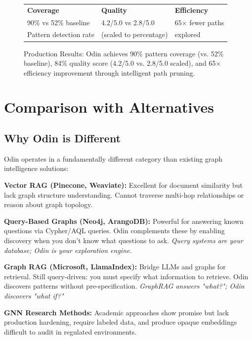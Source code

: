 \documentclass[11pt]{article}
\begin{document}
\begin{figure}[ht]
\begin{center}
\begin{tabular}{p{4cm}p{4cm}p{4cm}}
\small\textbf{Coverage} & \small\textbf{Quality} & \small\textbf{Efficiency} \\
\scriptsize 90\% vs 52\% baseline & \scriptsize 4.2/5.0 vs 2.8/5.0 & \scriptsize 65× fewer paths \\
\scriptsize Pattern detection rate & \scriptsize (scaled to percentage) & \scriptsize explored \\
\end{tabular}
\end{center}
\caption{Production Results: Odin achieves 90\% pattern coverage (vs. 52\% baseline), 84\% quality score (4.2/5.0 vs. 2.8/5.0 scaled), and 65× efficiency improvement through intelligent path pruning.}
\label{fig:results}
\end{figure}

\section{Comparison with Alternatives}

\subsection{Why Odin is Different}

Odin operates in a fundamentally different category than existing graph intelligence solutions:

\textbf{Vector RAG (Pinecone, Weaviate):} Excellent for document similarity but lack graph structure understanding. Cannot traverse multi-hop relationships or reason about graph topology.

\textbf{Query-Based Graphs (Neo4j, ArangoDB):} Powerful for answering known questions via Cypher/AQL queries. Odin complements these by enabling discovery when you don't know what questions to ask. \textit{Query systems are your database; Odin is your exploration engine.}

\textbf{Graph RAG (Microsoft, LlamaIndex):} Bridge LLMs and graphs for retrieval. Still query-driven: you must specify what information to retrieve. Odin discovers patterns without pre-specification. \textit{GraphRAG answers "what?"; Odin discovers "what if?"}

\textbf{GNN Research Methods:} Academic approaches show promise but lack production hardening, require labeled data, and produce opaque embeddings difficult to audit in regulated environments.
\end{document}

